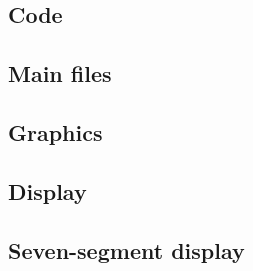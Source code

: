 
\clearpage
\begin{appendices}

% 

\section{Code}

\subsection{Main files}

\clearpage

\clearpage

\subsection{Graphics}

\clearpage

\clearpage

\clearpage

\subsection{Display}

\clearpage

\subsection{Seven-segment display}

\clearpage

\clearpage

\end{appendices}
